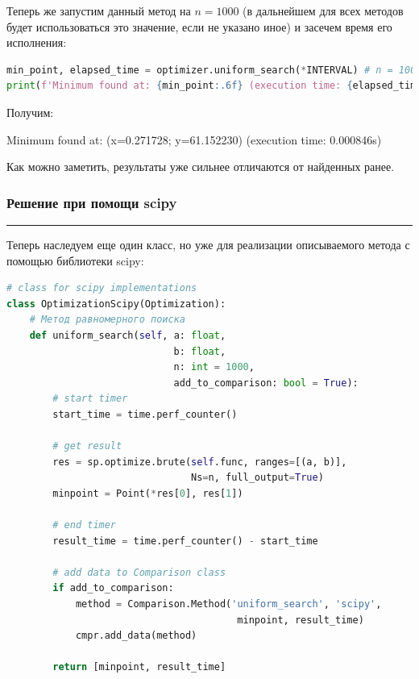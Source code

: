 \documentclass[a4paper, 14pt]{extarticle}
\begin{document}
Теперь же запустим данный метод на $n=1000$ (в дальнейшем для всех 
методов будет использоваться это значение, если не указано иное) 
и засечем время его исполнения:

\begin{center}
    \begin{lstlisting}[language=Python]
min_point, elapsed_time = optimizer.uniform_search(*INTERVAL) # n = 1000 (default)
print(f'Minimum found at: {min_point:.6f} (execution time: {elapsed_time:.6f}s)')
    \end{lstlisting}
\end{center}

Получим:

\begin{center}
    Minimum found at: (x=0.271728; y=61.152230) (execution time: 0.000846s)
\end{center}

Как можно заметить, результаты уже сильнее отличаются от найденных ранее.

\subsubsection*{Решение при помощи scipy}\vspace{-20pt}\rule{\linewidth}{0.1mm}

Теперь наследуем еще один класс, но уже для реализации описываемого 
метода с помощью библиотеки scipy:

\begin{center}
    \begin{lstlisting}[language=Python]
# class for scipy implementations
class OptimizationScipy(Optimization):
    # Метод равномерного поиска
    def uniform_search(self, a: float, 
                             b: float,
                             n: int = 1000,
                             add_to_comparison: bool = True):
        # start timer
        start_time = time.perf_counter()
        
        # get result
        res = sp.optimize.brute(self.func, ranges=[(a, b)], 
                                Ns=n, full_output=True)
        minpoint = Point(*res[0], res[1])

        # end timer
        result_time = time.perf_counter() - start_time
        
        # add data to Comparison class
        if add_to_comparison:
            method = Comparison.Method('uniform_search', 'scipy', 
                                        minpoint, result_time)
            cmpr.add_data(method)

        return [minpoint, result_time]
    \end{lstlisting}
\end{center}
\end{document}
